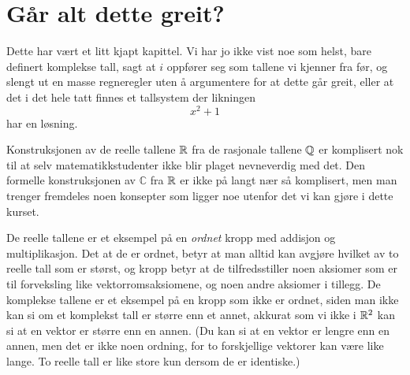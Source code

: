 \section*{Går alt dette greit?}
Dette har vært et litt kjapt kapittel. 
Vi har jo ikke vist noe som helst, bare definert komplekse tall, sagt at $i$ oppfører seg som tallene vi kjenner fra før, 
og slengt ut en masse regneregler uten å argumentere for at dette går greit, 
eller at det i det hele tatt finnes et tallsystem der likningen
\[
x^2+1
\]
har en løsning. 

Konstruksjonen av de reelle tallene $\mathbb{R}$ fra de rasjonale tallene $\mathbb{Q}$ er komplisert nok til at selv matematikkstudenter ikke blir plaget nevneverdig med det. 
Den formelle konstruksjonen av $\mathbb C$ fra $\mathbb{R}$ er ikke på langt nær så komplisert, 
men man trenger fremdeles noen konsepter som ligger noe utenfor det vi kan gjøre i dette kurset.

De reelle tallene er et eksempel på en \emph{ordnet} kropp med addisjon og multiplikasjon. 
Det at de er ordnet, betyr at man alltid kan avgjøre hvilket av to reelle tall som er størst, 
og kropp betyr at de tilfredsstiller noen aksiomer som er til forveksling like vektorromsaksiomene, 
og noen andre aksiomer i tillegg. 
De komplekse tallene er et eksempel på en kropp som ikke er ordnet, 
siden man ikke kan si om et komplekst tall er større enn et annet, 
akkurat som vi ikke i $\mathbb{R}^2$ kan si at en vektor er større enn en annen. 
(Du kan si at en vektor er lengre enn en annen, men det er ikke noen ordning, 
for to forskjellige vektorer kan være like lange. 
To reelle tall er like store kun dersom de er identiske.)


%
%
%
%
%
%
%
%
\kapittelslutt
